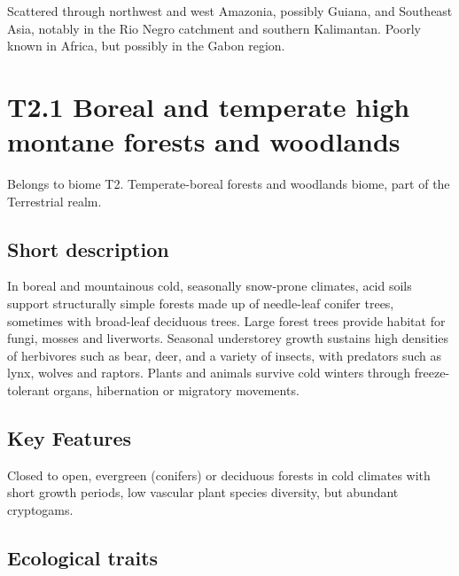 \documentclass[
  letterpaper,
  DIV=11,
  numbers=noendperiod]{scrartcl}
\begin{document}
Scattered through northwest and west Amazonia, possibly Guiana, and
Southeast Asia, notably in the Rio Negro catchment and southern
Kalimantan. Poorly known in Africa, but possibly in the Gabon region.

\section{T2.1 Boreal and temperate high montane forests and
woodlands}\label{t2.1-boreal-and-temperate-high-montane-forests-and-woodlands}

Belongs to biome T2. Temperate-boreal forests and woodlands biome, part
of the Terrestrial realm.

\subsection{Short description}\label{short-description-73}

In boreal and mountainous cold, seasonally snow-prone climates, acid
soils support structurally simple forests made up of needle-leaf conifer
trees, sometimes with broad-leaf deciduous trees. Large forest trees
provide habitat for fungi, mosses and liverworts. Seasonal understorey
growth sustains high densities of herbivores such as bear, deer, and a
variety of insects, with predators such as lynx, wolves and raptors.
Plants and animals survive cold winters through freeze-tolerant organs,
hibernation or migratory movements.

\subsection{Key Features}\label{key-features-73}

Closed to open, evergreen (conifers) or deciduous forests in cold
climates with short growth periods, low vascular plant species
diversity, but abundant cryptogams.

\subsection{Ecological traits}\label{ecological-traits-73}
\end{document}
